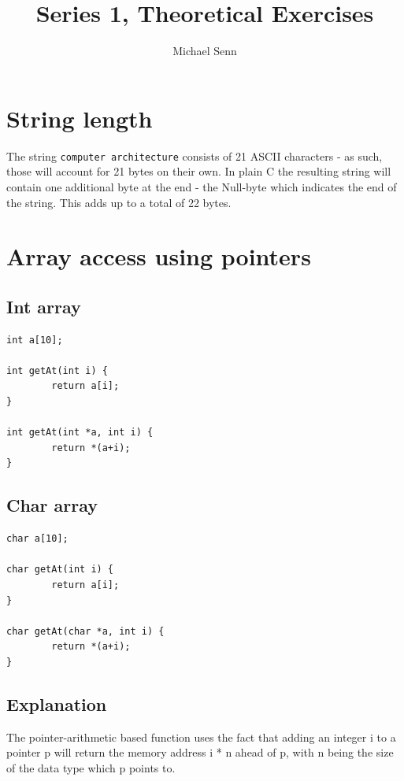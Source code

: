 \documentclass[a4paper]{scrartcl}
\title{Series 1, Theoretical Exercises}
\author{Michael Senn}
\date{}
\begin{document}
\maketitle


\section{String length}

The string \texttt{computer architecture} consists of 21 ASCII characters - as
such, those will account for 21 bytes on their own. In plain C the resulting
string will contain one additional byte at the end - the Null-byte which
indicates the end of the string. This adds up to a total of 22 bytes.

\section{Array access using pointers}

\subsection{Int array}

\begin{lstlisting}
int a[10];

int getAt(int i) {
        return a[i];
}

int getAt(int *a, int i) {
        return *(a+i);
}
\end{lstlisting}


\subsection{Char array}


\begin{lstlisting}
char a[10];

char getAt(int i) {
        return a[i];
}

char getAt(char *a, int i) {
        return *(a+i);
}
\end{lstlisting}

\subsection{Explanation}

The pointer-arithmetic based function uses the fact that adding an integer i to
a pointer p will return the memory address i * n ahead of p, with n being the
size of the data type which p points to.
\end{document}
